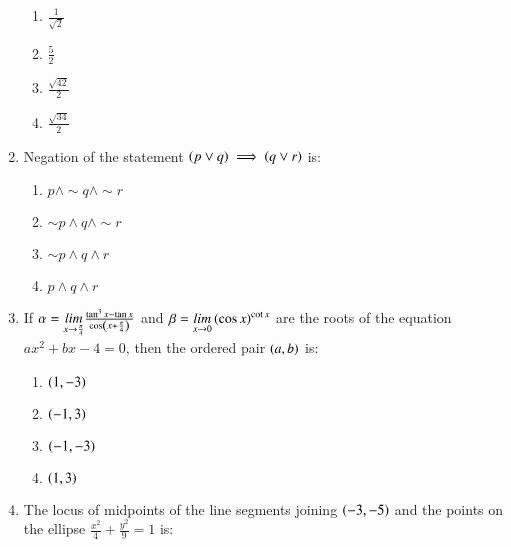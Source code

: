 \documentclass[journal]{IEEEtran}
\begin{document}
\begin{enumerate}
        \begin{multicols}{4}
            \begin{enumerate}
                \item $\frac{1}{\sqrt{2}}$
                \item $\frac{5}{2}$
                \item $\frac{\sqrt{42}}{2}$
                \item $\frac{\sqrt{34}}{2}$
            \end{enumerate}
        \end{multicols}

    \item Negation of the statement $\left(p\lor q\right)\implies\left(q\lor r\right)$ is:

        \begin{multicols}{4}
            \begin{enumerate}
                \item $p\land \sim q\land \sim r$
                \item $\sim p\land q\land \sim r$
                \item $\sim p\land q\land r$
                \item $p\land q\land r$
            \end{enumerate}
        \end{multicols}
		
    \item If $\alpha=\underset{x\to\frac{\pi}{4}}{lim}\frac{\tan^3 x-\tan x}{\cos\left(x+\frac{\pi}{4}\right)}$ and $\beta=\underset{x\to 0}{lim}\left(\cos x\right)^{\cot x}$ are the roots of the equation $ax^2+bx-4=0$, then the ordered pair $\left(a,b\right)$ is:

        \begin{multicols}{4}
            \begin{enumerate}
                \item $\left(1,-3\right)$
                \item $\left(-1,3\right)$
                \item $\left(-1,-3\right)$
                \item $\left(1,3\right)$
            \end{enumerate}
        \end{multicols}

    \item The locus of midpoints of the line segments joining $\left(-3,-5\right)$ and the points on the ellipse $\frac{x^2}{4}+\frac{y^2}{9}=1$ is:


\end{enumerate}
\end{document}
